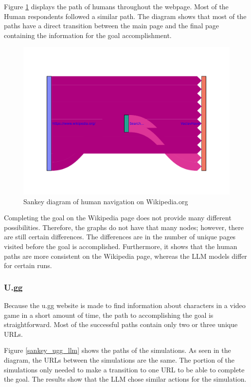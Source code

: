 Figure \ref{sankey_wikipedia_human} displays the path of humans throughout the webpage. Most of the Human respondents followed a similar path. The diagram shows that most of the paths have a direct transition between the main page and the final page containing the information for the goal accomplishment. 

\begin{figure}[H]
    \centering
    \includegraphics[width=\textwidth]{obrazky-figures/sankey_wikipedia_human.pdf}
    \caption{Sankey diagram of human navigation on Wikipedia.org}
    \label{sankey_wikipedia_human}
\end{figure}

Completing the goal on the Wikipedia page does not provide many different possibilities. Therefore, the graphs do not have that many nodes; however, there are still certain differences. The differences are in the number of unique pages visited before the goal is accomplished. Furthermore, it shows that the human paths are more consistent on the Wikipedia page, whereas the LLM models differ for certain runs.

\subsubsection{U.gg}

Because the u.gg website is made to find information about characters in a video game in a short amount of time, the path to accomplishing the goal is straightforward. Most of the successful paths contain only two or three unique URLs. 

Figure \ref{sankey_ugg_llm} shows the paths of the simulations. As seen in the diagram, the URLs between the simulations are the same. The portion of the simulations only needed to make a transition to one URL to be able to complete the goal. The results show that the LLM chose similar actions for the simulation.

